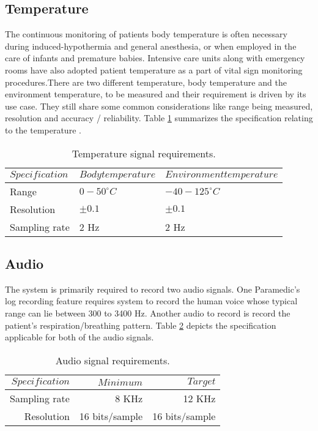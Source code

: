 \subsection{Temperature}
\hspace{10mm}The continuous monitoring of patients body temperature is often necessary during induced-hypothermia and general anesthesia, or when employed in the care of infants and premature babies. Intensive care units along with emergency rooms have also adopted patient temperature as a part of vital sign monitoring procedures.There are two different temperature, body temperature and the environment temperature, to be measured and their requirement is driven by its use case. They still share some common considerations like range being measured, resolution and accuracy / reliability.  Table \ref{table:tmp} summarizes the specification relating to the temperature . 
\begin{table}[h]
	\centering
	\begin{tabular}{|l |l|l|}
		\hline
		$Specification$ & $Body temperature$ & $Environment temperature$ \\
		\hline
		Range & $0-50 ^{\circ}C$ & $-40-125 ^{\circ}C$ \\
		Resolution & $\pm 0.1$ & $\pm 0.1$\\
		Sampling rate & 2 Hz & 2 Hz \\
		\hline
	\end{tabular}
	\caption{Temperature signal requirements.}
	\label{table:tmp}
\end{table}

\subsection{Audio}
\hspace{10mm}The system is primarily required to record two audio signals. One   Paramedic's log recording feature requires system to record the human voice whose typical range can lie between 300 to 3400 Hz. Another audio to record is record the patient's respiration/breathing pattern. Table \ref{table:aud} depicts the specification applicable for both of the audio signals. 

\begin{table}[h]
	\centering
	\begin{tabular}{|r |r|r|}
		\hline
		$Specification$ & $Minimum$ & $Target$ \\
		\hline
		Sampling rate &  8 KHz & 12 KHz \\
		Resolution & 16 bits/sample & 16 bits/sample \\
		\hline
	\end{tabular}
	\caption{Audio signal requirements.}
	\label{table:aud}
\end{table}
